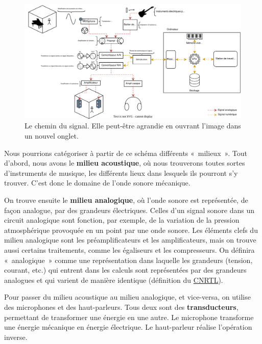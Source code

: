 \documentclass[
]{book}
\begin{document}
\begin{figure}

{\centering \includegraphics[width=1\linewidth]{_resources/diagrams/cheminSignal} 

}

\caption{Le chemin du signal. Elle peut-être agrandie en ouvrant l'image dans un nouvel onglet.}\label{fig:unnamed-chunk-20}
\end{figure}

Nous pourrions catégoriser à partir de ce schéma différents «~milieux~». Tout d'abord, nous avons le \textbf{milieu acoustique}, où nous trouverons toutes sortes d'instruments de musique, les différents lieux dans lesquels ils pourront s'y trouver. C'est donc le domaine de l'onde sonore mécanique.

On trouve ensuite le \textbf{milieu analogique}, où l'onde sonore est représentée, de façon analogue, par des grandeurs électriques. Celles d'un signal sonore dans un circuit analogique sont fonction, par exemple, de la variation de la pression atmosphérique provoquée en un point par une onde sonore. Les éléments clefs du milieu analogique sont les préamplificateurs et les amplificateurs, mais on trouve aussi certains traitements, comme les égaliseurs et les compresseurs. On définira «~analogique~» comme une représentation dans laquelle les grandeurs (tension, courant, etc.) qui entrent dans les calculs sont représentées par des grandeurs analogues et qui varient de manière identique (définition du \href{https://www.cnrtl.fr/definition/analogique}{CNRTL}).

Pour passer du milieu acoustique au milieu analogique, et vice-versa, on utilise des microphones et des haut-parleurs. Tous deux sont des \textbf{transducteurs}, permettant de transformer une énergie en une autre. Le microphone transforme une énergie mécanique en énergie électrique. Le haut-parleur réalise l'opération inverse.
\end{document}
